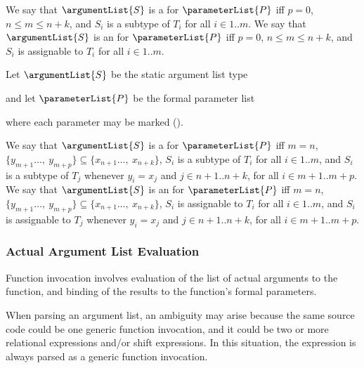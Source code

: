 \documentclass[makeidx]{article}
\begin{document}
{\LMHash{}%
We say that $\argumentList{S}$ is
a  for $\parameterList{P}$
if{}f $p = 0$, $n \leq m \leq n+k$, and $S_i$ is
a subtype of $T_i$ for all $i \in 1 .. m$.
We say that $\argumentList{S}$ is
an  for $\parameterList{P}$
if{}f $p = 0$, $n \leq m \leq n+k$, and $S_i$ is
assignable to $T_i$ for all $i \in 1 .. m$.

\LMHash{}%
Let $\argumentList{S}$ be the static argument list type


\noindent
and let $\parameterList{P}$ be the formal parameter list


\noindent
where each parameter may be marked \COVARIANT{}
().

\LMHash{}%
We say that $\argumentList{S}$ is
a  for $\parameterList{P}$
if{}f $m = n$,
$\{y_{m+1}\ldots,\ y_{m+p}\} \subseteq \{x_{n+1}\ldots,\ x_{n+k}\}$,
$S_i$ is a subtype of $T_i$ for all $i \in 1 .. m$,
and $S_i$ is a subtype of $T_j$ whenever $y_i = x_j$ and
$j \in n + 1 .. n + k$, for all
$i \in m + 1 .. m + p$.
We say that $\argumentList{S}$
is an  for $\parameterList{P}$
if{}f $m = n$,
$\{y_{m+1}\ldots,\ y_{m+p}\} \subseteq \{x_{n+1}\ldots,\ x_{n+k}\}$,
$S_i$ is assignable to $T_i$ for all $i \in 1 .. m$,
and $S_i$ is assignable to $T_j$ whenever $y_i = x_j$ and
$j \in n + 1 .. n + k$, for all
$i \in m + 1 .. m + p$.



\subsubsection{Actual Argument List Evaluation}

\LMHash{}%
Function invocation involves evaluation of the list of actual arguments to the function,
and binding of the results to the function's formal parameters.

\LMHash{}%
When parsing an argument list, an ambiguity may arise because the same source code could be one generic function invocation,
and it could be two or more relational expressions and/or shift expressions.
In this situation, the expression is always parsed as a generic function invocation.

}
\end{document}
